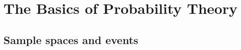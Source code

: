 \chapter{The Basics of Probability Theory}\label{ch:probability-theory}

\section{Sample spaces and events}


